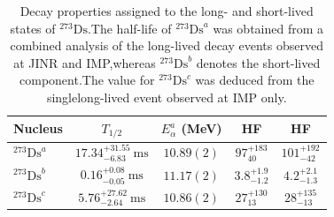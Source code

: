 \documentclass[11pt]{article}
\begin{document}
\begin{table}[htbp]
\centering
\caption{Decay properties assigned to the long- and short-lived states of $^{273}\mathrm{Ds}$.The half-life of $^{273}\mathrm{Ds}^{a}$ was obtained from a combined analysis of the long-lived decay events observed at JINR and IMP,whereas $^{273}\mathrm{Ds}^{b}$ denotes the short-lived component.The value for $^{273}\mathrm{Ds}^{c}$ was deduced from the singlelong-lived event observed at IMP only.}
\label{tab:decay_properties}
\begingroup
\renewcommand{\arraystretch}{1.22}
\setlength{\tabcolsep}{7pt}
\begin{tabular*}{0.92\textwidth}{@{\extracolsep{\fill}}lcccc@{}}
\toprule
Nucleus
& $T_{1/2}$
& \shortstack{$E_{\alpha}^{a}$\\(\si{\mega\electronvolt})}
& \shortstack{HF\\ \cite{HFPoenaru,HFE}}
& \shortstack{HF\\ \cite{HFVs}}
\\
\midrule

$^{273}\mathrm{Ds}^{a}$
& $17.34^{+31.55}_{-6.83}\ \mathrm{ms}$
& $10.89(2)$
& $97^{+183}_{40}$
& $101^{+192}_{-42}$
\\
\addlinespace[0.25em]

$^{273}\mathrm{Ds}^{b}$
& $0.16^{+0.08}_{-0.05}\ \mathrm{ms}$
& $11.17(2)$
& $3.8^{+1.9}_{-1.2}$
& $4.2^{+2.1}_{-1.3}$
\\
\addlinespace[0.25em]

$^{273}\mathrm{Ds}^{c}$
& $5.76^{+27.62}_{-2.64}\ \mathrm{ms}$
& $10.86(2)$
& $27^{+130}_{13}$
& $28^{+135}_{-13}$
\\



\bottomrule
\end{tabular*}
\endgroup
\end{table}
\end{document}
